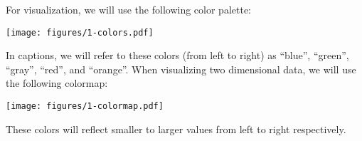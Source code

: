 For visualization, we will use the following color palette:
\begin{center}
\texttt{[image: figures/1-colors.pdf]}
\end{center}
In captions, we will refer to these colors (from left to right) as ``blue'', ``green'', ``gray'', ``red'', and ``orange''.
When visualizing two dimensional data, we will use the following colormap:
\begin{center}
\texttt{[image: figures/1-colormap.pdf]}
\end{center}
These colors will reflect smaller to larger values from left to right respectively.
